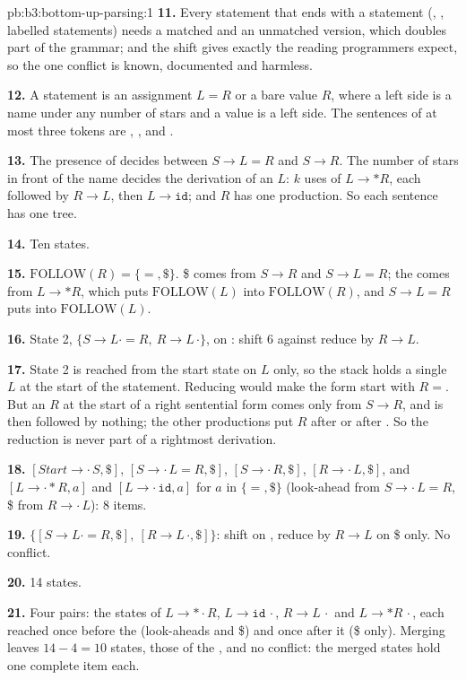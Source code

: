 \begin{solution}{pb:b3:bottom-up-parsing:1}
\textbf{11.} Every statement that ends with a statement (, , labelled statements) needs a matched and an unmatched version, which doubles part of the grammar; and the shift gives exactly the reading programmers expect, so the one conflict is known, documented and harmless.

\textbf{12.} A statement is an assignment $L = R$ or a bare value $R$, where a left side is a name under any number of stars and a value is a left side. The sentences of at most three tokens are , ,  and .

\textbf{13.} The presence of \code{=} decides between $S \to L = R$ and $S \to R$. The number of stars in front of the name decides the derivation of an $L$: $k$ uses of $L \to * R$, each followed by $R \to L$, then $L \to \mathtt{id}$; and $R$ has one production. So each sentence has one tree.

\textbf{14.} Ten states.

\textbf{15.} $\mathrm{FOLLOW}(R) = \{=, \$\}$. \$ comes from $S \to R$ and $S \to L = R$; the \code{=} comes from $L \to * R$, which puts $\mathrm{FOLLOW}(L)$ into $\mathrm{FOLLOW}(R)$, and $S \to L = R$ puts \code{=} into $\mathrm{FOLLOW}(L)$.

\textbf{16.} State 2, $\{S \to L \cdot = R,\ R \to L\,\cdot\}$, on \code{=}: shift 6 against reduce by $R \to L$.

\textbf{17.} State 2 is reached from the start state on $L$ only, so the stack holds a single $L$ at the start of the statement. Reducing would make the form start with $R =$. But an $R$ at the start of a right sentential form comes only from $S \to R$, and is then followed by nothing; the other productions put $R$ after \code{*} or after \code{=}. So the reduction is never part of a rightmost derivation.

\textbf{18.} $[\mathit{Start} \to \cdot\,S, \$]$, $[S \to \cdot\,L = R, \$]$, $[S \to \cdot\,R, \$]$, $[R \to \cdot\,L, \$]$, and $[L \to \cdot * R, a]$ and $[L \to \cdot\,\mathtt{id}, a]$ for $a$ in $\{=, \$\}$ (look-ahead \code{=} from $S \to \cdot\,L = R$, \$ from $R \to \cdot\,L$): 8 items.

\textbf{19.} $\{[S \to L \cdot = R, \$],\ [R \to L\,\cdot, \$]\}$: shift on \code{=}, reduce by $R \to L$ on \$ only. No conflict.

\textbf{20.} 14 states.

\textbf{21.} Four pairs: the states of $L \to * \cdot R$, $L \to \mathtt{id}\,\cdot$, $R \to L\,\cdot$ and $L \to * R\,\cdot$, each reached once before the \code{=} (look-aheads \code{=} and \$) and once after it (\$ only). Merging leaves $14 - 4 = 10$ states, those of the , and no conflict: the merged states hold one complete item each.


\end{solution}
